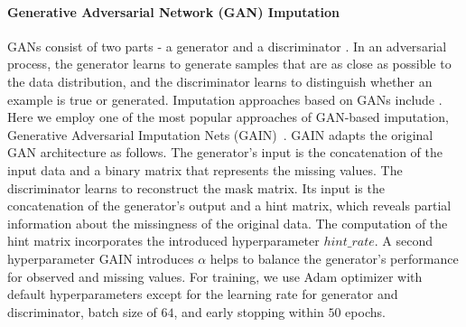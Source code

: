 \documentclass[utf8]{frontiersSCNS} %
\begin{document}
\paragraph{Generative Adversarial Network (GAN) Imputation}
%
GANs consist of two parts - a generator and a discriminator \citep{GAN}. In an adversarial process, the generator learns to generate samples that are as close as possible to the data distribution, and the discriminator learns to distinguish whether an example is true or generated. Imputation approaches based on GANs include \cite{GAIN, VIGAN, MisGAN}.
Here we employ one of the most popular approaches of GAN-based imputation, Generative Adversarial Imputation Nets (GAIN)~\citep{GAIN}.
GAIN adapts the original GAN architecture as follows.
The generator's input is the concatenation of the input data and a binary matrix that represents the missing values. The discriminator learns to reconstruct the mask matrix. Its input is the concatenation of the generator's output and a hint matrix, which reveals partial information about the missingness of the original data. The computation of the hint matrix incorporates the introduced hyperparameter $hint\_rate$. A second hyperparameter GAIN introduces $\alpha$ helps to balance the generator's performance for observed and missing values.
For training, we use Adam optimizer with default hyperparameters except for the learning rate for generator and discriminator, batch size of $64$, and early stopping within $50$ epochs.
\end{document}
